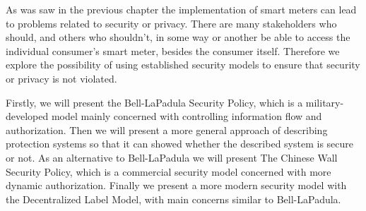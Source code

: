 
As was saw in the previous chapter the implementation of smart meters can lead to problems related to security or privacy.
There are many stakeholders who should, and others who shouldn't, in some way or another be able to access the individual consumer's smart meter, besides the consumer itself.
Therefore we explore the possibility of using established security models to ensure that security or privacy is not violated.

Firstly, we will present the Bell-LaPadula Security Policy, which is a military-developed model mainly concerned with controlling information flow and authorization.
Then we will present a more general approach of describing protection systems so that it can showed whether the described system is secure or not.
As an alternative to Bell-LaPadula we will present The Chinese Wall Security Policy, which is a commercial security model concerned with more dynamic authorization.
Finally we present a more modern security model with the Decentralized Label Model, with main concerns similar to Bell-LaPadula.
